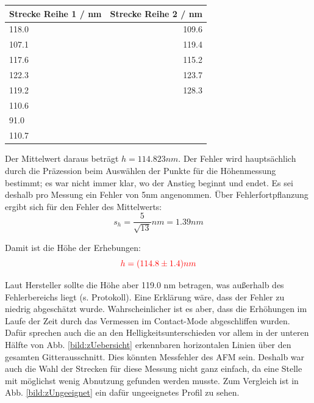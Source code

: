 \begin{center}
    \centering
    \begin{tabular}{l|r}
        Strecke Reihe 1 /  nm & Strecke Reihe 2 / nm \\
        \hline
        118.0 & 109.6 \\
        107.1 & 119.4 \\
        117.6 & 115.2 \\
        122.3 & 123.7 \\
        119.2 & 128.3 \\
        110.6 & \\
        91.0 & \\
        110.7 & \\
        
    \end{tabular}
\end{center}

Der Mittelwert daraus beträgt $h = 114.823 nm$.
Der Fehler wird hauptsächlich durch die Präzession beim Auswählen der Punkte für die Höhenmessung bestimmt; es war nicht immer klar, 
wo der Anstieg beginnt und endet. Es sei deshalb pro Messung ein Fehler von 5nm angenommen. Über Fehlerfortpflanzung ergibt sich für 
den Fehler des Mittelwerts: 
\begin{equation*}
    s_h = \frac{5}{\sqrt{13}} nm = 1.39 nm
\end{equation*}

Damit ist die Höhe der Erhebungen: 
\begin{equation*}
    \textcolor{red}{h = (114.8 \pm 1.4)nm}
\end{equation*}

Laut Hersteller sollte die Höhe aber 119.0 nm betragen, was außerhalb des Fehlerbereichs liegt (s. Protokoll). Eine Erklärung wäre, dass der Fehler 
zu niedrig abgeschätzt wurde. Wahrscheinlicher ist es aber, dass die Erhöhungen im Laufe der Zeit durch das Vermessen im Contact-Mode 
abgeschliffen wurden. Dafür sprechen auch die an den Helligkeitsunterschieden vor allem in der unteren Hälfte von 
Abb. \ref{bild:zUebersicht} erkennbaren horizontalen Linien über den gesamten Gitterausschnitt. Dies könnten Messfehler des 
AFM sein. Deshalb war auch die Wahl der Strecken für diese Messung nicht ganz einfach, da 
eine Stelle mit möglichst wenig Abnutzung gefunden werden musste. Zum Vergleich ist in Abb. \ref{bild:zUngeeignet} ein dafür 
ungeeignetes Profil zu sehen.


